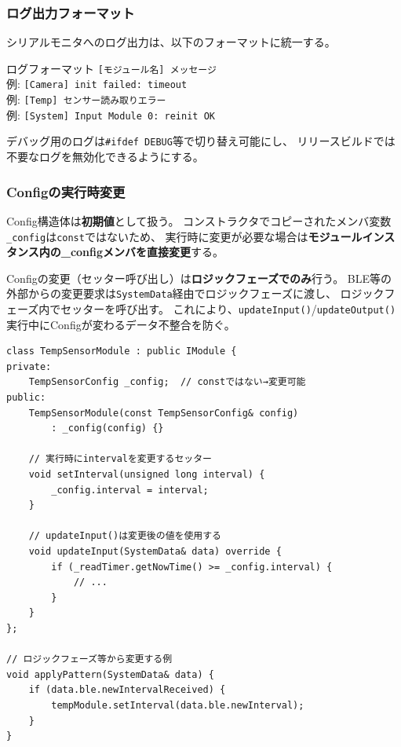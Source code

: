\subsubsection{ログ出力フォーマット}

シリアルモニタへのログ出力は、以下のフォーマットに統一する。

\begin{funcblock}{ログフォーマット}
\texttt{[モジュール名] メッセージ}\\
例: \texttt{[Camera] init failed: timeout}\\
例: \texttt{[Temp] センサー読み取りエラー}\\
例: \texttt{[System] Input Module 0: reinit OK}
\end{funcblock}

デバッグ用のログは\texttt{\#ifdef DEBUG}等で切り替え可能にし、
リリースビルドでは不要なログを無効化できるようにする。

\subsubsection{Configの実行時変更}

Config構造体は\textbf{初期値}として扱う。
コンストラクタでコピーされたメンバ変数\texttt{\_config}は\texttt{const}ではないため、
実行時に変更が必要な場合は\textbf{モジュールインスタンス内の\_configメンバを直接変更}する。

\begin{cautionbox}[Config変更のタイミング]
Configの変更（セッター呼び出し）は\textbf{ロジックフェーズでのみ}行う。
BLE等の外部からの変更要求は\texttt{SystemData}経由でロジックフェーズに渡し、
ロジックフェーズ内でセッターを呼び出す。
これにより、\texttt{updateInput()}/\texttt{updateOutput()}実行中にConfigが変わるデータ不整合を防ぐ。
\end{cautionbox}

\begin{lstlisting}[style=cppstyle, caption={Config値の実行時変更例}]
class TempSensorModule : public IModule {
private:
    TempSensorConfig _config;  // constではない→変更可能
public:
    TempSensorModule(const TempSensorConfig& config)
        : _config(config) {}

    // 実行時にintervalを変更するセッター
    void setInterval(unsigned long interval) {
        _config.interval = interval;
    }

    // updateInput()は変更後の値を使用する
    void updateInput(SystemData& data) override {
        if (_readTimer.getNowTime() >= _config.interval) {
            // ...
        }
    }
};

// ロジックフェーズ等から変更する例
void applyPattern(SystemData& data) {
    if (data.ble.newIntervalReceived) {
        tempModule.setInterval(data.ble.newInterval);
    }
}
\end{lstlisting}
